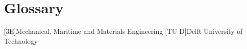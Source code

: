 %
\chapter{Glossary} %
%
\printacronyms
\begin{acronym}[\hspace{0.8in}] %
	[3E]{Mechanical, Maritime and Materials Engineering}%
	[TU D]{Delft University of Technology}%
\end{acronym}%
%
\printnomencl
